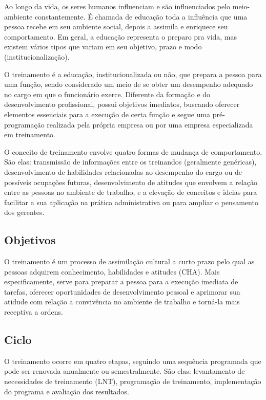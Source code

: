 \documentclass[12pt]{article}
\begin{document}
Ao longo da vida, os seres humanos influenciam e são influenciados pelo meio-ambiente constantemente. É chamada de educação toda a influência que uma pessoa recebe em seu ambiente social, depois a assimila e enriquece seu comportamento. Em geral, a educação representa o preparo pra vida, mas existem vários tipos que variam em seu objetivo, prazo e modo (institucionalização). 

O treinamento é a educação, institucionalizada ou não, que prepara a pessoa para uma função, sendo considerado um meio de se obter um desempenho adequado no cargo em que o funcionário exerce. Diferente da formação e do desenvolvimento profissional, possui objetivos imediatos, buscando oferecer elementos essenciais para a execução de certa função e segue uma pré-programação realizada pela própria empresa ou por uma empresa especializada em treinamento.

O conceito de treinamento envolve quatro formas de mudança de comportamento. São elas: transmissão de informações entre os treinandos (geralmente genéricas), desenvolvimento de habilidades relacionadas ao desempenho do cargo ou de possíveis ocupações futuras, desenvolvimento de atitudes que envolvem a relação entre as pessoas no ambiente de trabalho, e a elevação de conceitos e ideias para facilitar a sua aplicação na prática administrativa ou para ampliar o pensamento dos gerentes.

\subsection{Objetivos}

O treinamento é um processo de assimilação cultural a curto prazo pelo qual as pessoas adquirem conhecimento, habilidades e atitudes (CHA). Mais especificamente, serve para preparar a pessoa para a execução imediata de tarefas, oferecer oportunidades de desenvolvimento pessoal e aprimorar sua atidude com relação a convivência no ambiente de trabalho e torná-la mais receptiva a ordens.

\subsection{Ciclo}

O treinamento ocorre em quatro etapas, seguindo uma sequência programada que pode ser renovada anualmente ou semestralmente. São elas: levantamento de necessidades de treinamento (LNT), programação de treinamento, implementação do programa e avaliação dos resultados.
\end{document}

